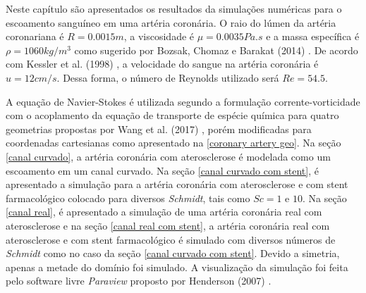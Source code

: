 Neste capítulo são apresentados os resultados
da simulações numéricas para o escoamento sanguíneo
em uma artéria coronária.
O raio do lúmen da artéria coronariana é $R=0.0015m$,
a viscosidade é $\mu=0.0035Pa.s$ e
a massa específica é $\rho=1060kg/m^3$ como sugerido
por Bozsak, Chomaz e Barakat (2014) \cite{bozsak2014}. De acordo com Kessler et al. (1998) \cite{kessler1998},
a velocidade do sangue na artéria coronária é $u=12cm/s$.
Dessa forma, o número de Reynolds utilizado será $Re=54.5$.\par
A equação de Navier-Stokes
é utilizada segundo a formulação corrente-vorticidade
com o acoplamento da equação de transporte de espécie
química para quatro geometrias propostas por Wang et al. (2017) \cite{wang2017},
porém modificadas para coordenadas cartesianas como apresentado
na \ref{coronary artery geo}.
Na seção \ref{canal curvado}, a artéria coronária com aterosclerose é modelada
como um escoamento em um canal curvado. Na seção \ref{canal curvado com stent},
é apresentado a simulação para a artéria coronária com aterosclerose
e com stent farmacológico colocado para diversos \textit{Schmidt},
tais como $Sc=1$ e $10$. Na seção \ref{canal real}, é apresentado
a simulação de uma artéria coronária real com aterosclerose e na
seção \ref{canal real com stent}, a artéria coronária real com aterosclerose e com stent
farmacológico é simulado com diversos números de \textit{Schmidt}
como no caso da seção \ref{canal curvado com stent}. 
Devido a simetria, apenas a metade do domínio foi
simulado. A visualização da simulação foi feita pelo software livre \textit{Paraview}
proposto por Henderson (2007) \cite{paraview}.


